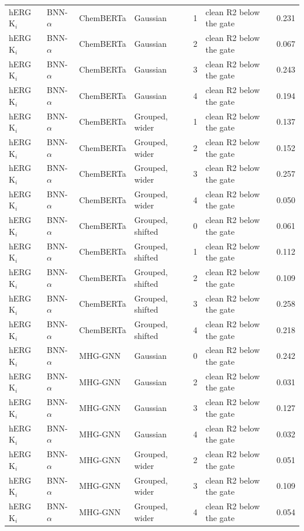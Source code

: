 {\begin{longtable}{llllcll}
hERG K$_i$ & BNN-$\alpha$ & ChemBERTa & Gaussian & 1 & clean R2 below the gate & 0.231 \\
hERG K$_i$ & BNN-$\alpha$ & ChemBERTa & Gaussian & 2 & clean R2 below the gate & 0.067 \\
hERG K$_i$ & BNN-$\alpha$ & ChemBERTa & Gaussian & 3 & clean R2 below the gate & 0.243 \\
hERG K$_i$ & BNN-$\alpha$ & ChemBERTa & Gaussian & 4 & clean R2 below the gate & 0.194 \\
hERG K$_i$ & BNN-$\alpha$ & ChemBERTa & Grouped, wider & 1 & clean R2 below the gate & 0.137 \\
hERG K$_i$ & BNN-$\alpha$ & ChemBERTa & Grouped, wider & 2 & clean R2 below the gate & 0.152 \\
hERG K$_i$ & BNN-$\alpha$ & ChemBERTa & Grouped, wider & 3 & clean R2 below the gate & 0.257 \\
hERG K$_i$ & BNN-$\alpha$ & ChemBERTa & Grouped, wider & 4 & clean R2 below the gate & 0.050 \\
hERG K$_i$ & BNN-$\alpha$ & ChemBERTa & Grouped, shifted & 0 & clean R2 below the gate & 0.061 \\
hERG K$_i$ & BNN-$\alpha$ & ChemBERTa & Grouped, shifted & 1 & clean R2 below the gate & 0.112 \\
hERG K$_i$ & BNN-$\alpha$ & ChemBERTa & Grouped, shifted & 2 & clean R2 below the gate & 0.109 \\
hERG K$_i$ & BNN-$\alpha$ & ChemBERTa & Grouped, shifted & 3 & clean R2 below the gate & 0.258 \\
hERG K$_i$ & BNN-$\alpha$ & ChemBERTa & Grouped, shifted & 4 & clean R2 below the gate & 0.218 \\
hERG K$_i$ & BNN-$\alpha$ & MHG-GNN & Gaussian & 0 & clean R2 below the gate & 0.242 \\
hERG K$_i$ & BNN-$\alpha$ & MHG-GNN & Gaussian & 2 & clean R2 below the gate & 0.031 \\
hERG K$_i$ & BNN-$\alpha$ & MHG-GNN & Gaussian & 3 & clean R2 below the gate & 0.127 \\
hERG K$_i$ & BNN-$\alpha$ & MHG-GNN & Gaussian & 4 & clean R2 below the gate & 0.032 \\
hERG K$_i$ & BNN-$\alpha$ & MHG-GNN & Grouped, wider & 2 & clean R2 below the gate & 0.051 \\
hERG K$_i$ & BNN-$\alpha$ & MHG-GNN & Grouped, wider & 3 & clean R2 below the gate & 0.109 \\
hERG K$_i$ & BNN-$\alpha$ & MHG-GNN & Grouped, wider & 4 & clean R2 below the gate & 0.054 \\

\end{longtable}}
